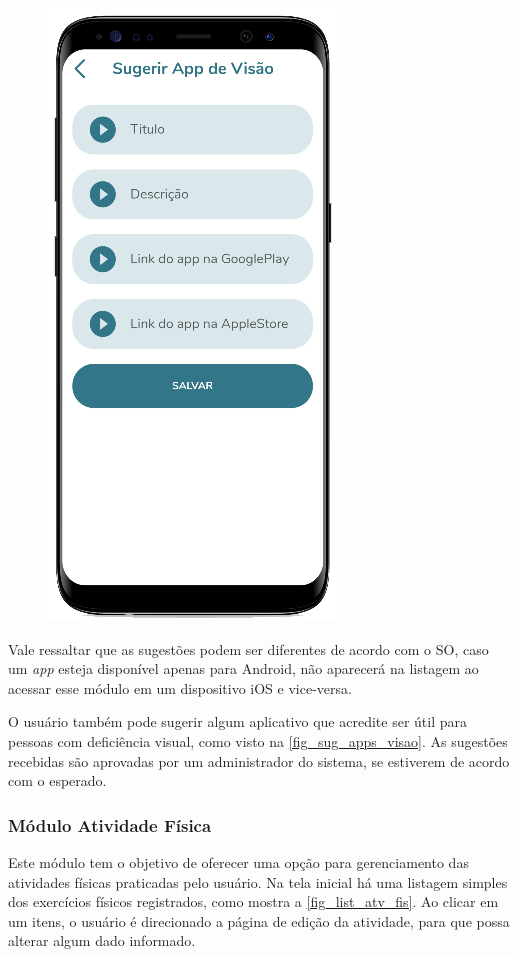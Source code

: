 \begin{figure}[htb]
\begin{minipage}{0.45\textwidth}
        \includegraphics[scale=0.66]{Imagens/desenvolvimento/app/sug_apps_visao.png}
    \end{minipage}
\end{figure}

Vale ressaltar que as sugestões podem ser diferentes de acordo com o SO, caso um \emph{app} esteja disponível
apenas para Android, não aparecerá na listagem ao acessar esse módulo em um dispositivo iOS e vice-versa.

O usuário também pode sugerir algum aplicativo que acredite ser útil para pessoas com deficiência visual, como
visto na \autoref{fig_sug_apps_visao}. As sugestões recebidas são aprovadas por um administrador do sistema, se
estiverem de acordo com o esperado.

\subsubsection{Módulo Atividade Física}

Este módulo tem o objetivo de oferecer uma opção para gerenciamento das atividades físicas praticadas
pelo usuário. Na tela inicial há uma listagem simples dos exercícios físicos registrados, como mostra a
\autoref{fig_list_atv_fis}. Ao clicar em um itens, o usuário é direcionado a página de edição da atividade,
para que possa alterar algum dado informado.


